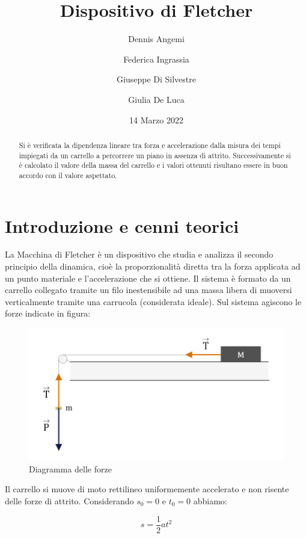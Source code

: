 \documentclass[11pt,a4paper]{article}
\title{Dispositivo di Fletcher}
\author[1]{Dennis Angemi}%
\author[1]{Federica Ingrassia}%
\author[1]{Giuseppe Di Silvestre}%
\author[1]{Giulia De Luca}%
\affil[1]{Dipartimento di Fisica e Astronomia ``Ettore Majorana'' - Università degli Studi di Catania}%
\date{14 Marzo 2022}
\begin{document}
\maketitle

\begin{abstract}
   
Si è verificata la dipendenza lineare tra forza e accelerazione dalla misura dei tempi impiegati da un carrello a percorrere un piano in assenza di attrito. Successivamente si è calcolato il valore della massa del carrello e i valori ottenuti risultano essere in buon accordo con il valore aspettato.
   
\end{abstract}

\section{Introduzione e cenni teorici}
La Macchina di Fletcher è un dispositivo che studia e analizza il secondo principio della dinamica, cioè la proporzionalità diretta tra la forza applicata ad un punto materiale e l'accelerazione che si ottiene.
Il sistema è formato da un carrello collegato tramite un filo inestensibile ad una massa libera di muoversi verticalmente tramite una carrucola (considerata ideale).
Sul sistema agiscono le forze indicate in figura:

\begin{figure}[H]
\includegraphics[scale=0.3]{force-diagram.png}
\centering
\caption{Diagramma delle forze}
\label{fig:forze}
\end{figure}

Il carrello si muove di moto rettilineo uniformemente accelerato e non risente delle forze di attrito.
Considerando $s_0=0$ e $t_0=0$ abbiamo:

\begin{equation}
    s=\frac{1}{2}at^2
\end{equation}
\end{document}
